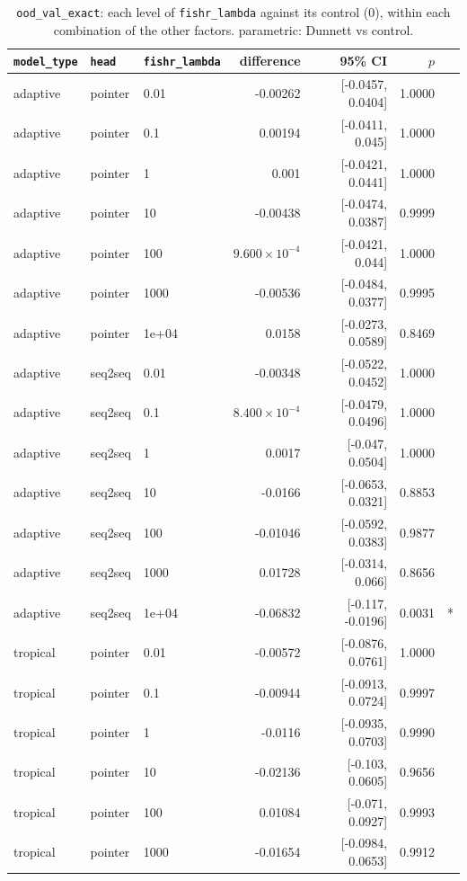 \documentclass[10pt]{article}
\begin{document}
{\small
\begin{longtable}{lllrrrl}
\caption{\texttt{ood\_val\_exact}: each level of \texttt{fishr\_lambda} against its control (0), within each combination of the other factors. parametric: Dunnett vs control.}\label{tab:control-ood_val_exact}\\
\toprule
\texttt{model\_type} & \texttt{head} & \texttt{fishr\_lambda} & difference & 95\% CI & $p$ & \\
\midrule
\endhead
adaptive & pointer & 0.01 & -0.00262 & [-0.0457, 0.0404] & 1.0000 & \\
adaptive & pointer & 0.1 & 0.00194 & [-0.0411, 0.045] & 1.0000 & \\
adaptive & pointer & 1 & 0.001 & [-0.0421, 0.0441] & 1.0000 & \\
adaptive & pointer & 10 & -0.00438 & [-0.0474, 0.0387] & 0.9999 & \\
adaptive & pointer & 100 & $9.600\times10^{-4}$ & [-0.0421, 0.044] & 1.0000 & \\
adaptive & pointer & 1000 & -0.00536 & [-0.0484, 0.0377] & 0.9995 & \\
adaptive & pointer & 1e+04 & 0.0158 & [-0.0273, 0.0589] & 0.8469 & \\
adaptive & seq2seq & 0.01 & -0.00348 & [-0.0522, 0.0452] & 1.0000 & \\
adaptive & seq2seq & 0.1 & $8.400\times10^{-4}$ & [-0.0479, 0.0496] & 1.0000 & \\
adaptive & seq2seq & 1 & 0.0017 & [-0.047, 0.0504] & 1.0000 & \\
adaptive & seq2seq & 10 & -0.0166 & [-0.0653, 0.0321] & 0.8853 & \\
adaptive & seq2seq & 100 & -0.01046 & [-0.0592, 0.0383] & 0.9877 & \\
adaptive & seq2seq & 1000 & 0.01728 & [-0.0314, 0.066] & 0.8656 & \\
adaptive & seq2seq & 1e+04 & -0.06832 & [-0.117, -0.0196] & 0.0031 & *\\
tropical & pointer & 0.01 & -0.00572 & [-0.0876, 0.0761] & 1.0000 & \\
tropical & pointer & 0.1 & -0.00944 & [-0.0913, 0.0724] & 0.9997 & \\
tropical & pointer & 1 & -0.0116 & [-0.0935, 0.0703] & 0.9990 & \\
tropical & pointer & 10 & -0.02136 & [-0.103, 0.0605] & 0.9656 & \\
tropical & pointer & 100 & 0.01084 & [-0.071, 0.0927] & 0.9993 & \\
tropical & pointer & 1000 & -0.01654 & [-0.0984, 0.0653] & 0.9912 & \\

\end{longtable}}
\end{document}

